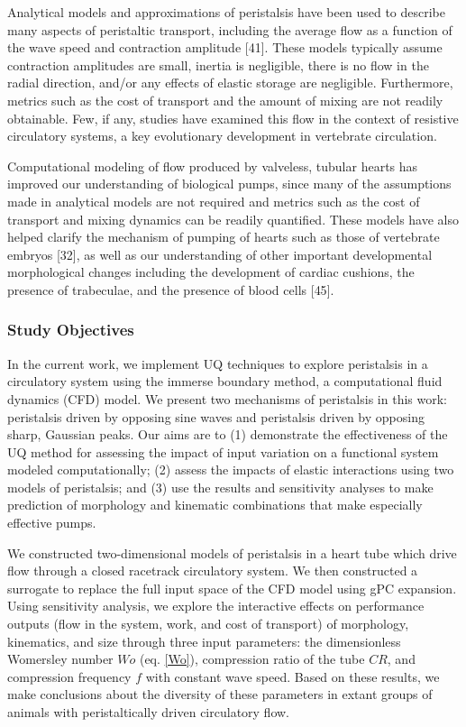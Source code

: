 \documentclass[
]{article}
\begin{document}
Analytical models and approximations of peristalsis have been used to
describe many aspects of peristaltic transport, including the average
flow as a function of the wave speed and contraction amplitude {[}41{]}.
These models typically assume contraction amplitudes are small, inertia
is negligible, there is no flow in the radial direction, and/or any
effects of elastic storage are negligible. Furthermore, metrics such as
the cost of transport and the amount of mixing are not readily
obtainable. Few, if any, studies have examined this flow in the context
of resistive circulatory systems, a key evolutionary development in
vertebrate circulation.

Computational modeling of flow produced by valveless, tubular hearts has
improved our understanding of biological pumps, since many of the
assumptions made in analytical models are not required and metrics such
as the cost of transport and mixing dynamics can be readily quantified.
These models have also helped clarify the mechanism of pumping of hearts
such as those of vertebrate embryos {[}32{]}, as well as our
understanding of other important developmental morphological changes
including the development of cardiac cushions, the presence of
trabeculae, and the presence of blood cells {[}45{]}.

\hypertarget{study-objectives}{%
\subsubsection{Study Objectives}\label{study-objectives}}

In the current work, we implement UQ techniques to explore peristalsis
in a circulatory system using the immerse boundary method, a
computational fluid dynamics (CFD) model. We present two mechanisms of
peristalsis in this work: peristalsis driven by opposing sine waves and
peristalsis driven by opposing sharp, Gaussian peaks. Our aims are to
(1) demonstrate the effectiveness of the UQ method for assessing the
impact of input variation on a functional system modeled
computationally; (2) assess the impacts of elastic interactions using
two models of peristalsis; and (3) use the results and sensitivity
analyses to make prediction of morphology and kinematic combinations
that make especially effective pumps.

We constructed two-dimensional models of peristalsis in a heart tube
which drive flow through a closed racetrack circulatory system. We then
constructed a surrogate to replace the full input space of the CFD model
using gPC expansion. Using sensitivity analysis, we explore the
interactive effects on performance outputs (flow in the system, work,
and cost of transport) of morphology, kinematics, and size through three
input parameters: the dimensionless Womersley number \(Wo\) (eq.
\ref{Wo}), compression ratio of the tube \(CR\), and compression
frequency \(f\) with constant wave speed. Based on these results, we
make conclusions about the diversity of these parameters in extant
groups of animals with peristaltically driven circulatory flow.
\end{document}
